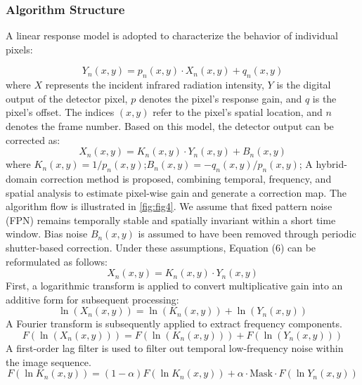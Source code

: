\documentclass[a4paper,fleqn]{cas-dc}
\begin{document}
\subsubsection{Algorithm Structure}

A linear response model is adopted to characterize the behavior of individual pixels\citep{liu_strong_2023}:

\begin{equation}
Y_n(x, y) = p_n(x, y) \cdot X_n(x, y) + q_n(x, y)
\end{equation}
where $X$ represents the incident infrared radiation intensity, $Y$ is the digital output of the detector pixel, $p$ denotes the pixel's response gain, and $q$ is the pixel's offset. The indices $\left(x,y\right)$ refer to the pixel's spatial location, and $n$ denotes the frame number.
Based on this model, the detector output can be corrected as:
\begin{equation}
X_n(x, y) = K_n(x, y) \cdot Y_n(x, y) + B_n(x, y)
\end{equation}
where $K_n\left(x,y\right)=1/p_n\left(x,y\right)$;$B_n\left(x,y\right)=-q_n\left(x,y\right)/p_n\left(x,y\right)$;
A hybrid-domain correction method is proposed, combining temporal, frequency, and spatial analysis to estimate pixel-wise gain and generate a correction map. The algorithm flow is illustrated in \cref{fig:fig4}. We assume that fixed pattern noise (FPN) remains temporally stable and spatially invariant within a short time window. Bias noise $B_n\left(x,y\right)$ is assumed to have been removed through periodic shutter-based correction.
Under these assumptions, Equation (6) can be reformulated as follows: 
\begin{equation}
X_n(x, y) = K_n(x, y) \cdot Y_n(x, y)
\end{equation}
First, a logarithmic transform is applied to convert multiplicative gain into an additive form for subsequent processing:
\begin{equation}
\ln\left(X_n(x, y)\right) = \ln\left(K_n(x, y)\right) + \ln\left(Y_n(x, y)\right)
\end{equation}
A Fourier transform is subsequently applied to extract frequency components. 
\begin{equation}
F\left( \ln\left(X_n(x, y)\right) \right) = F\left( \ln\left(K_n(x, y)\right) \right) + F\left( \ln\left(Y_n(x, y)\right) \right)
\end{equation}
A first-order lag filter is used to filter out temporal low-frequency noise within the image sequence.
\begin{equation}
F\left( \ln K_n(x, y) \right) = (1 - \alpha) F\left( \ln K_n(x, y) \right) + \alpha \cdot \text{Mask} \cdot F\left( \ln Y_n(x, y) \right)
\end{equation}
\end{document}
